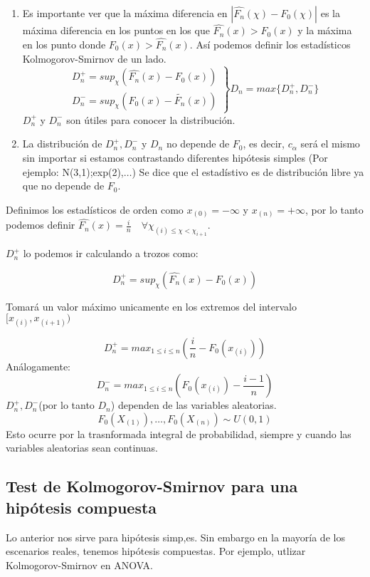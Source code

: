 \begin{enumerate}
    \item Es importante ver que la máxima diferencia en $|\widehat{F_n}(\chi)-F_0(\chi)|$ es la máxima 
    diferencia en los puntos en los que $\widehat{F_n}(x)>F_0(x)$ y la máxima en los punto donde $F_0(x)>\widehat{F_n}(x)$. 
    Así podemos definir los estadísticos Kolmogorov-Smirnov de un lado.
    \[
    \left.
    \begin{matrix}
        D_n^+=sup_\chi(\widehat{F_n}(x)-F_0(x)) \\
        D_n^-=sup_\chi(F_0(x)-\widetilde{F_n}(x))
    \end{matrix}
    \right\}
    D_n=max\{D_n^+,D_n^-\}
    \]
    $D_n^+$ y $D_n^-$ son útiles para conocer la distribución.
    \item La distribución de $D_n^+,D_n^-$ y $D_n$ no depende de $F_0$, es decir, $c_\alpha$
    será el mismo sin importar si estamos contrastando diferentes hipótesis simples (Por ejemplo: N(3,1);exp(2),$\dots$)
    Se dice que el estadístivo es de distribución libre ya que no depende de $F_0$.
\end{enumerate}

Definimos los estadísticos de orden como $x_{(0)}=-\infty$ y $x_{(n)}=+\infty$, por lo tanto podemos definir $\widehat{F_n}(x)=\frac{i}{n} \quad \forall \chi_{(i)\leq \chi < \chi_{i+1}}$.

$D_n^+$ lo podemos ir calculando a trozos como:

\[
    D_n^+=sup_\chi(\widehat{F_n}(x)-F_0(x))
\]

Tomará un valor máximo unicamente en los extremos del intervalo $[x_{(i)},x_{(i+1)})$

\[
    D_n^+=max_{1 \leq i \leq n}\left(\frac{i}{n}-F_0(x_{(i)})\right)
\]
Análogamente:
\[
    D_n^-=max_{1 \leq i \leq n}\left(F_0(x_{(i)})-\frac{i-1}{n}\right)
\]
$D_n^+,D_n^-$(por lo tanto $D_n$) dependen de las variables aleatorias.
\[
F_0(X_{(1)}),\dots,F_0(X_{(n)}) \sim U(0,1)
\]
Esto ocurre por la trasnformada integral de probabilidad, siempre y cuando las variables aleatorias sean continuas.


\subsection{Test de Kolmogorov-Smirnov para una hipótesis compuesta}

Lo anterior nos sirve para hipótesis simp,es. Sin embargo en la mayoría de los escenarios reales, tenemos hipótesis compuestas.
Por ejemplo, utlizar Kolmogorov-Smirnov en ANOVA.

